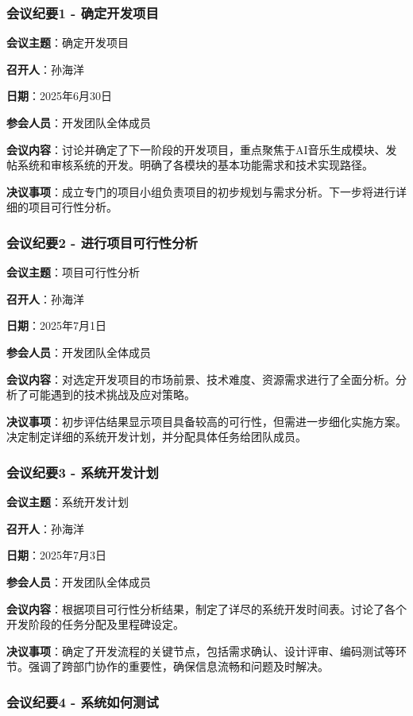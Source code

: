 \documentclass{base}
\numberwithin{figure}{section} %
\begin{document}
\subsubsection{会议纪要1 - 确定开发项目}

\textbf{会议主题}：确定开发项目

\textbf{召开人}：孙海洋

\textbf{日期}：2025年6月30日

\textbf{参会人员}：开发团队全体成员

\textbf{会议内容}：讨论并确定了下一阶段的开发项目，重点聚焦于AI音乐生成模块、发帖系统和审核系统的开发。明确了各模块的基本功能需求和技术实现路径。

\textbf{决议事项}：成立专门的项目小组负责项目的初步规划与需求分析。下一步将进行详细的项目可行性分析。

\subsubsection{会议纪要2 - 进行项目可行性分析}

\textbf{会议主题}：项目可行性分析

\textbf{召开人}：孙海洋

\textbf{日期}：2025年7月1日

\textbf{参会人员}：开发团队全体成员

\textbf{会议内容}：对选定开发项目的市场前景、技术难度、资源需求进行了全面分析。分析了可能遇到的技术挑战及应对策略。

\textbf{决议事项}：初步评估结果显示项目具备较高的可行性，但需进一步细化实施方案。决定制定详细的系统开发计划，并分配具体任务给团队成员。

\subsubsection{会议纪要3 - 系统开发计划}

\textbf{会议主题}：系统开发计划

\textbf{召开人}：孙海洋

\textbf{日期}：2025年7月3日

\textbf{参会人员}：开发团队全体成员

\textbf{会议内容}：根据项目可行性分析结果，制定了详尽的系统开发时间表。讨论了各个开发阶段的任务分配及里程碑设定。

\textbf{决议事项}：确定了开发流程的关键节点，包括需求确认、设计评审、编码测试等环节。强调了跨部门协作的重要性，确保信息流畅和问题及时解决。

\subsubsection{会议纪要4 - 系统如何测试}
\end{document}

